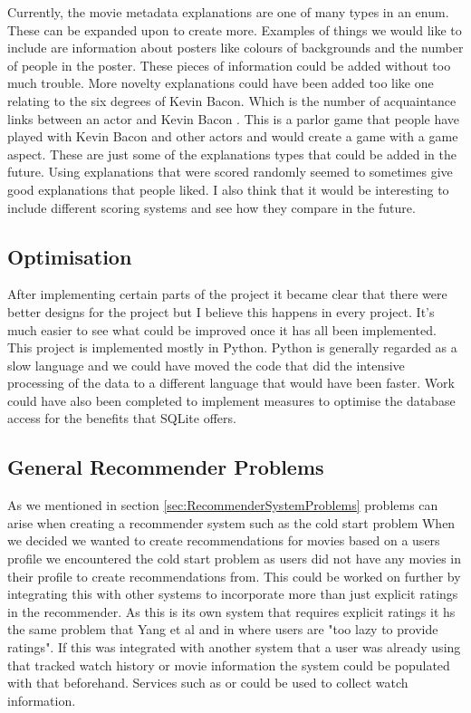             Currently, the movie metadata explanations are one of many types in an enum. These can be expanded upon to create more. Examples of things we would like to include are information about posters like colours of backgrounds and the number of people in the poster. These pieces of information could be added without too much trouble. More novelty explanations could have been added too like one relating to the six degrees of Kevin Bacon. Which is the number of acquaintance links between an actor and Kevin Bacon \cite{SixDegreesOfKevinBacon}. This is a parlor game that people have played with Kevin Bacon and other actors and would create a game with a game aspect. These are just some of the explanations types that could be added in the future. Using explanations that were scored randomly seemed to sometimes give good explanations that people liked. I also think that it would be interesting to include different scoring systems and see how they compare in the future.

        \subsection{Optimisation}
            After implementing certain parts of the project it became clear that there were better designs for the project but I believe this happens in every project. It's much easier to see what could be improved once it has all been implemented. This project is implemented mostly in Python. Python is generally regarded as a slow language and we could have moved the code that did the intensive processing of the data to a different language that would have been faster. Work could have also been completed to implement measures to optimise the database access for the benefits that SQLite offers. 

        \subsection{General Recommender Problems }
            As we mentioned in section \ref{sec:RecommenderSystemProblems} problems can arise when creating a recommender system such as the cold start problem When we decided we wanted to create recommendations for movies based on a users profile we encountered the cold start problem as users did not have any movies in their profile to create recommendations from. This could be worked on further by integrating this with other systems to incorporate more than just explicit ratings in the recommender. As this is its own system that requires explicit ratings it hs the same problem that Yang et al and in \cite{10.1145/1555400.1555432} where users are "too lazy to provide ratings". If this was integrated with another system that a user was already using that tracked watch history or movie information the system could be populated with that beforehand. Services such as \cite{TraktTV} or \cite{PlexTV} could be used to collect watch information. 

